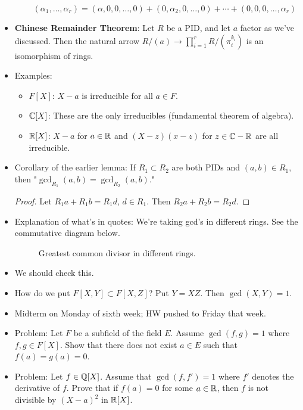 \documentclass[../notes.tex]{subfiles}
\begin{document}
\begin{itemize}
\begin{itemize}
        \begin{equation*}
            (\alpha_1,\dots,\alpha_r) = (\alpha,0,0,\dots,0)+(0,\alpha_2,0,\dots,0)+\cdots+(0,0,0,\dots,\alpha_r)
        \end{equation*}
    \end{itemize}
    \item \textbf{Chinese Remainder Theorem}: Let $R$ be a PID, and let $a$ factor as we've discussed. Then the natural arrow $R/(a)\to\prod_{i=1}^rR/(\pi_i^{k_i})$ is an isomorphism of rings.
    \item Examples:
    \begin{itemize}
        \item $F[X]$: $X-a$ is irreducible for all $a\in F$.
        \item $\mathbb{C}[X]$: These are the only irreducibles (fundamental theorem of algebra).
        \item $\mathbb{R}[X]$: $X-a$ for $a\in\mathbb{R}$ and $(X-z)(x-z)$ for $z\in\mathbb{C}-\mathbb{R}$ are all irreducible.
    \end{itemize}
    \item Corollary of the earlier lemma: If $R_1\subset R_2$ are both PIDs and $(a,b)\in R_1$, then "$\gcd_{R_1}(a,b)=\gcd_{R_2}(a,b)$."
    \begin{proof}
        Let $R_1a+R_1b=R_1d$, $d\in R_1$. Then $R_2a+R_2b=R_2d$.
    \end{proof}
    \item Explanation of what's in quotes: We're taking gcd's in different rings. See the commutative diagram below.
    \begin{figure}[h!]
        \centering
        \caption{Greatest common divisor in different rings.}
        \label{fig:gcdContext}
    \end{figure}
    \item We should check this.
    \item How do we put $F[X,Y]\subset F[X,Z]$? Put $Y=XZ$. Then $\gcd(X,Y)=1$.
    \item Midterm on Monday of sixth week; HW pushed to Friday that week.
    \item Problem: Let $F$ be a subfield of the field $E$. Assume $\gcd(f,g)=1$ where $f,g\in F[X]$. Show that there does not exist $a\in E$ such that $f(a)=g(a)=0$.
    \item Problem: Let $f\in\mathbb{Q}[X]$. Assume that $\gcd(f,f')=1$ where $f'$ denotes the derivative of $f$. Prove that if $f(a)=0$ for some $a\in\mathbb{R}$, then $f$ is not divisible by $(X-a)^2$ in $\mathbb{R}[X]$.
\end{itemize}
\end{document}

